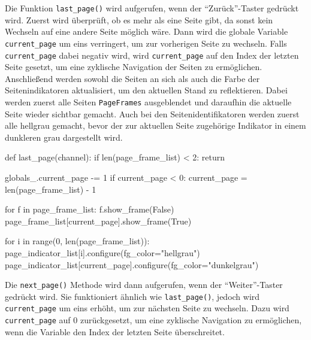 Die Funktion \lstinline{last_page()} wird aufgerufen, wenn der \enquote{Zurück}-Taster gedrückt wird. Zuerst wird überprüft, ob es mehr als eine Seite gibt, da sonst kein Wechseln auf eine andere Seite möglich wäre. Dann wird die globale Variable \lstinline{current_page} um eins verringert, um zur vorherigen Seite zu wechseln. Falls \lstinline{current_page} dabei negativ wird, wird \lstinline{current_page} auf den Index der letzten Seite gesetzt, um eine zyklische Navigation der Seiten zu ermöglichen. Anschließend werden sowohl  die Seiten an sich als auch die Farbe der Seitenindikatoren aktualisiert, um den aktuellen Stand zu reflektieren. Dabei werden zuerst alle Seiten \bzw \lstinline{PageFrames} ausgeblendet und daraufhin die aktuelle Seite wieder sichtbar gemacht. Auch bei den Seitenidentifikatoren werden zuerst alle hellgrau gemacht, bevor der zur aktuellen Seite zugehörige Indikator in einem dunkleren grau dargestellt wird.

\begin{pythoncode}
def last_page(channel):
    if len(page_frame_list) < 2:
        return

    globals_.current_page -= 1
    if current_page < 0:
        current_page = len(page_frame_list) - 1

    for f in page_frame_list:
        f.show_frame(False)
    page_frame_list[current_page].show_frame(True)  

    for i in range(0, len(page_frame_list)):
        page_indicator_list[i].configure(fg_color="hellgrau")
    page_indicator_list[current_page].configure(fg_color="dunkelgrau")
\end{pythoncode}

Die \lstinline{next_page()} Methode wird dann aufgerufen, wenn der \enquote{Weiter}-Taster gedrückt wird. Sie funktioniert ähnlich wie \lstinline{last_page()}, jedoch wird \lstinline{current_page} um eins erhöht, um zur nächsten Seite zu wechseln. Dazu wird \lstinline{current_page} auf 0 zurückgesetzt, um eine zyklische Navigation zu ermöglichen, wenn die Variable den Index der letzten Seite überschreitet.